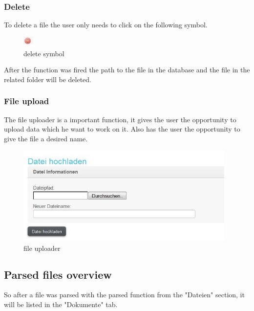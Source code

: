 \subsubsection{Delete}
To delete a file the user only needs to click on the following symbol.
\begin{figure}[!ht]
  \centering
    \includegraphics[width=0.05\textwidth]{images/basic_functionalities/delete_symbol.jpg}
  \caption{delete symbol}
  \label{fig:delete symbol}
\end{figure}
After the function was fired the path to the file in the database and the file in the related folder will be deleted.
\subsubsection{File upload}
The file uploader is a important function, it gives the user the opportunity to upload data which he want to work on it. Also has the user the opportunity to give the file a desired name.
\begin{figure}[!ht]
  \centering
    \includegraphics[width=0.97\textwidth]{images/basic_functionalities/datei_hochladen.jpg}
  \caption{file uploader}
  \label{fig:file uploader}
\end{figure}

\subsection{Parsed files overview}
So after a file was parsed with the parsed function from the "Dateien" section, it will be listed in the "Dokumente" tab.
